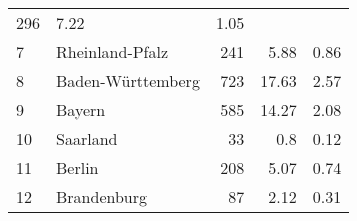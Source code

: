 \begin{longtable}{lXrrr}
       \num{296} &
       \num[round-mode=places,round-precision=2]{7,22} &
         \num[round-mode=places,round-precision=2]{1,05} \\

     7 &
     \multicolumn{1}{X}{ Rheinland-Pfalz   } &


       \num{241} &
       \num[round-mode=places,round-precision=2]{5,88} &
         \num[round-mode=places,round-precision=2]{0,86} \\

     8 &
     \multicolumn{1}{X}{ Baden-Württemberg   } &


       \num{723} &
       \num[round-mode=places,round-precision=2]{17,63} &
         \num[round-mode=places,round-precision=2]{2,57} \\

     9 &
     \multicolumn{1}{X}{ Bayern   } &


       \num{585} &
       \num[round-mode=places,round-precision=2]{14,27} &
         \num[round-mode=places,round-precision=2]{2,08} \\

     10 &
     \multicolumn{1}{X}{ Saarland   } &


       \num{33} &
       \num[round-mode=places,round-precision=2]{0,8} &
         \num[round-mode=places,round-precision=2]{0,12} \\

     11 &
     \multicolumn{1}{X}{ Berlin   } &


       \num{208} &
       \num[round-mode=places,round-precision=2]{5,07} &
         \num[round-mode=places,round-precision=2]{0,74} \\

     12 &
     \multicolumn{1}{X}{ Brandenburg   } &


       \num{87} &
       \num[round-mode=places,round-precision=2]{2,12} &
         \num[round-mode=places,round-precision=2]{0,31} \\


\end{longtable}
